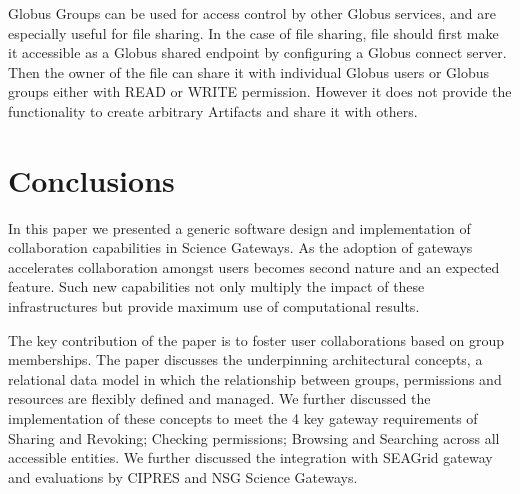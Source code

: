 \documentclass[sigconf]{acmart}
\begin{document}
Globus Groups \cite{globusFileSharing} can be used for access control by other Globus services, and are especially useful for file sharing. In the case of file sharing, file should first make it accessible as a Globus shared endpoint by configuring a Globus connect server. Then the owner of the file can share it with individual Globus users or Globus groups either with READ or WRITE permission. However it does not provide the functionality to create arbitrary Artifacts and share it with others.

\section{Conclusions}

In this paper we presented a generic software design and implementation of collaboration capabilities in Science Gateways. As the adoption of gateways accelerates collaboration amongst users becomes second nature and an expected feature. Such new capabilities not only multiply the impact of these infrastructures but provide maximum use of computational results. 

The key contribution of the paper is to foster user collaborations based on group memberships. The paper discusses the underpinning architectural concepts, a relational data model in which the relationship between groups, permissions and resources are flexibly defined and managed. We further discussed the implementation of these concepts to meet the 4 key gateway requirements of Sharing and Revoking; Checking permissions; Browsing and Searching across all accessible entities. We further discussed the integration with SEAGrid gateway and evaluations by CIPRES and NSG Science Gateways. 

%
%


 
\end{document}

